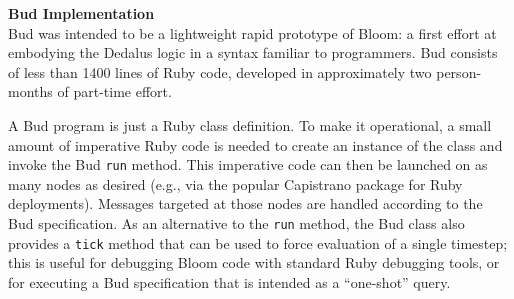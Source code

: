 \begin{comment}
Conventional wisdom in certain quarters says that rule-based languages are untenable for large programs that evolve over time, since the interactions among rules become too difficult to understand.  We believe this concern is an artifact of early rule languages that mixed apparently declarative syntax with imperative constructs and assumptions.  In fact, we demonstrate below that the pure logic-programming roots of Bloom can allow programmers to reason about many program interactions in a much deeper way than traditional imperative languages.
\end{comment}
%

\vspace{9pt}\noindent \textbf{Bud Implementation}\\
Bud was intended to be a lightweight rapid prototype of Bloom: a first effort at embodying the Dedalus logic in a syntax familiar to programmers.  Bud consists of less than 1400 lines of Ruby code, developed in approximately two person-months of part-time effort.


A Bud program is just a Ruby class definition.  To make it operational, a small amount of imperative Ruby code is needed to create an instance of the class and invoke the Bud \texttt{run} method.  This imperative code can then be launched on as many nodes as desired (e.g., via the popular Capistrano package for Ruby deployments).  Messages targeted at those nodes are handled according to the Bud specification.  As an alternative to the \texttt{run} method, the Bud class also provides a \texttt{tick} method that can be used to force evaluation of a single timestep; this is useful for debugging Bloom code with standard Ruby debugging tools, or for executing a Bud specification that is intended as a ``one-shot'' query.

